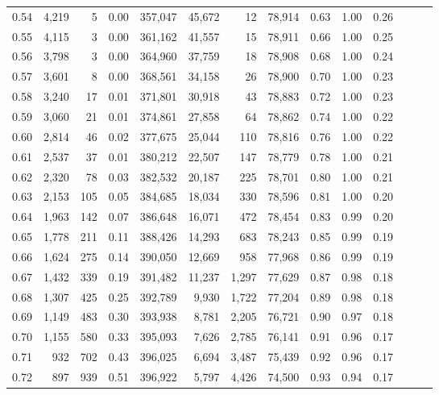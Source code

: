 \begin{tabular}{rrrrrrrrrrrrrr}
0.54 &  4,219 &      5 &  0.00 &  357,047 &   45,672 &      12 &  78,914 &  0.63 &  1.00 &      0.26 \\
0.55 &  4,115 &      3 &  0.00 &  361,162 &   41,557 &      15 &  78,911 &  0.66 &  1.00 &      0.25 \\
0.56 &  3,798 &      3 &  0.00 &  364,960 &   37,759 &      18 &  78,908 &  0.68 &  1.00 &      0.24 \\
0.57 &  3,601 &      8 &  0.00 &  368,561 &   34,158 &      26 &  78,900 &  0.70 &  1.00 &      0.23 \\
0.58 &  3,240 &     17 &  0.01 &  371,801 &   30,918 &      43 &  78,883 &  0.72 &  1.00 &      0.23 \\
0.59 &  3,060 &     21 &  0.01 &  374,861 &   27,858 &      64 &  78,862 &  0.74 &  1.00 &      0.22 \\
0.60 &  2,814 &     46 &  0.02 &  377,675 &   25,044 &     110 &  78,816 &  0.76 &  1.00 &      0.22 \\
0.61 &  2,537 &     37 &  0.01 &  380,212 &   22,507 &     147 &  78,779 &  0.78 &  1.00 &      0.21 \\
0.62 &  2,320 &     78 &  0.03 &  382,532 &   20,187 &     225 &  78,701 &  0.80 &  1.00 &      0.21 \\
0.63 &  2,153 &    105 &  0.05 &  384,685 &   18,034 &     330 &  78,596 &  0.81 &  1.00 &      0.20 \\
0.64 &  1,963 &    142 &  0.07 &  386,648 &   16,071 &     472 &  78,454 &  0.83 &  0.99 &      0.20 \\
0.65 &  1,778 &    211 &  0.11 &  388,426 &   14,293 &     683 &  78,243 &  0.85 &  0.99 &      0.19 \\
0.66 &  1,624 &    275 &  0.14 &  390,050 &   12,669 &     958 &  77,968 &  0.86 &  0.99 &      0.19 \\
0.67 &  1,432 &    339 &  0.19 &  391,482 &   11,237 &   1,297 &  77,629 &  0.87 &  0.98 &      0.18 \\
0.68 &  1,307 &    425 &  0.25 &  392,789 &    9,930 &   1,722 &  77,204 &  0.89 &  0.98 &      0.18 \\
0.69 &  1,149 &    483 &  0.30 &  393,938 &    8,781 &   2,205 &  76,721 &  0.90 &  0.97 &      0.18 \\
0.70 &  1,155 &    580 &  0.33 &  395,093 &    7,626 &   2,785 &  76,141 &  0.91 &  0.96 &      0.17 \\
0.71 &    932 &    702 &  0.43 &  396,025 &    6,694 &   3,487 &  75,439 &  0.92 &  0.96 &      0.17 \\
0.72 &    897 &    939 &  0.51 &  396,922 &    5,797 &   4,426 &  74,500 &  0.93 &  0.94 &      0.17 \\

\end{tabular}
